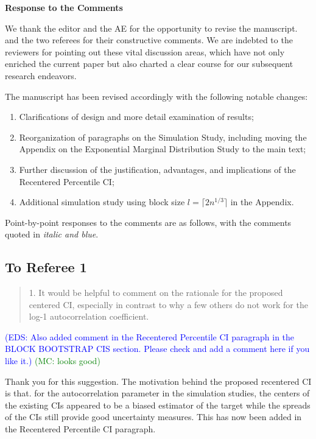 \documentclass[12pt]{article}
\newcommand{\eds}[1]{\textcolor{blue}{(EDS: #1)}}
\newcommand{\mc}[1]{\textcolor{green}{(MC: #1)}}
\newenvironment{comment}%
{\begin{quotation}\noindent\small\it\color{darkblue}\ignorespaces%
}{\end{quotation}}
\begin{document}
\begin{center}
  {\Large\bf Response to the Comments}
\end{center}



We thank the editor and the AE for the opportunity to revise the manuscript. and
the two referees for their constructive comments.
We are indebted to the reviewers for pointing out these vital discussion areas,
which have not only enriched the current paper but also charted a clear course
for our subsequent research endeavors.

The manuscript has been
revised accordingly with the following notable changes:
\begin{enumerate}
\item Clarifications of design and more detail examination of results;
\item Reorganization of paragraphs on the Simulation Study, including moving the
Appendix on the Exponential Marginal Distribution Study to the main text;
\item Further discussion of the justification, advantages, and implications of
the Recentered Percentile CI;
\item Additional simulation study using block size 
$l = \lceil 2n^{1/3} \rceil$ in the Appendix.
\end{enumerate}


Point-by-point responses to the comments are as follows, with the
comments quoted in \emph{\color{darkblue} italic and blue}.

\subsection*{To Referee 1}

\begin{comment}
1. It would be helpful to comment on the rationale for the proposed centered CI, 
especially in contrast to why a few others do not work for the log-1 
autocorrelation coefficient.
\end{comment}

\eds{Also added comment in the Recentered Percentile CI paragraph in the 
BLOCK BOOTSTRAP CIS section. Please check and add a comment here if you like it.}
\mc{looks good}

Thank you for this suggestion. The motivation behind the proposed
recentered CI is that. for the autocorrelation parameter in the
simulation studies, the centers of the existing CIs appeared to be a
biased estimator of the target while the spreads of the CIs still
provide good uncertainty measures. This has now been added in the
Recentered Percentile CI paragraph.
\end{document}
